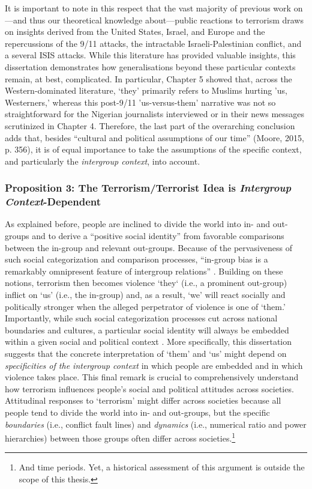 It is important to note in this respect that the vast majority of previous work on---and thus our theoretical knowledge about---public reactions to terrorism draws on insights derived from the United States, Israel, and Europe and the repercussions of the 9/11 attacks, the intractable Israeli-Palestinian conflict, and a several ISIS attacks. While this literature has provided valuable insights, this dissertation demonstrates how generalisations beyond these particular contexts remain, at best, complicated. In particular, Chapter 5 showed that, across the Western-dominated literature, `they' primarily refers to Muslims hurting 'us, Westerners,' whereas this post-9/11 'us-versus-them' narrative was not so straightforward for the Nigerian journalists interviewed or in their news messages scrutinized in Chapter 4. Therefore, the last part of the overarching conclusion adds that, besides ``cultural and political assumptions of our time'' (Moore, 2015, p. 356), it is of equal importance to take the assumptions of the specific context, and particularly the \textit{intergroup context}, into account.


\subsubsection{Proposition 3: The Terrorism/Terrorist Idea is \textit{Intergroup Context}-Dependent}
As explained before, people are inclined to divide the world into in- and out-groups and to derive a ``positive social identity'' from favorable comparisons between the in-group and relevant out-groups. Because of the pervasiveness of such social categorization and comparison processes, ``in-group bias is a remarkably omnipresent feature of intergroup relations'' \citep[p.~38-40; see also Brewer, \citeyear{Brewer1981}; Hewstone, Rubin, \& Willis, \citeyear{Hewstone2002}]{Tajfel1979}. Building on these notions, terrorism then becomes violence `they` (i.e., a prominent out-group) inflict on `us' (i.e., the in-group) and, as a result, `we' will react socially and politically stronger when the alleged perpetrator of violence is one of `them.' Importantly, while such social categorization processes cut across national boundaries and cultures, a particular social identity will always be embedded within a given social and political context \citep{Hewstone2002}. More specifically, this dissertation suggests that the concrete interpretation of `them' and `us' might depend on \textit{specificities of the intergroup context} in which people are embedded and in which violence takes place. This final remark is crucial to comprehensively understand how terrorism influences people's social and political attitudes across societies. Attitudinal responses to `terrorism' might differ across societies because all people tend to divide the world into in- and out-groups, but the specific \textit{boundaries} (i.e., conflict fault lines) and \textit{dynamics} (i.e., numerical ratio and power hierarchies) between those groups often differ across societies.\footnote{And time periods. Yet, a historical assessment of this argument is outside the scope of this thesis.}
\newpage

